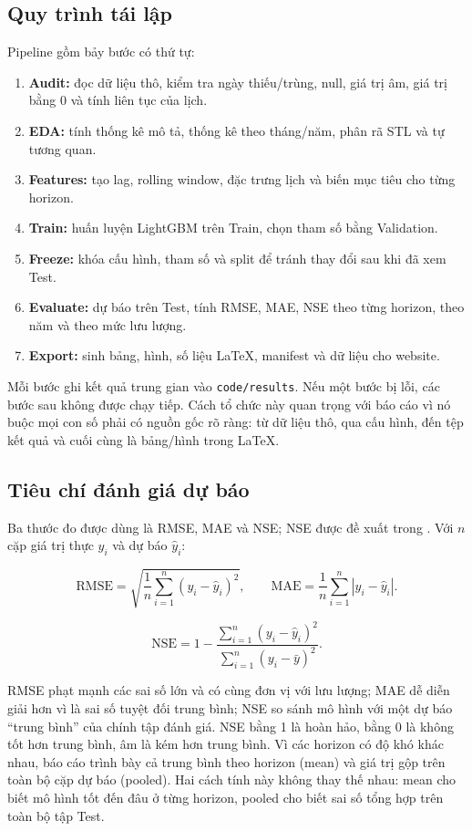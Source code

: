 \subsection{Quy trình tái lập}

Pipeline gồm bảy bước có thứ tự:

\begin{enumerate}[leftmargin=1.6em]
  \item \textbf{Audit:} đọc dữ liệu thô, kiểm tra ngày thiếu/trùng, null, giá trị
  âm, giá trị bằng 0 và tính liên tục của lịch.
  \item \textbf{EDA:} tính thống kê mô tả, thống kê theo tháng/năm, phân rã STL và
  tự tương quan.
  \item \textbf{Features:} tạo lag, rolling window, đặc trưng lịch và biến mục tiêu
  cho từng horizon.
  \item \textbf{Train:} huấn luyện LightGBM trên Train, chọn tham số bằng Validation.
  \item \textbf{Freeze:} khóa cấu hình, tham số và split để tránh thay đổi sau khi
  đã xem Test.
  \item \textbf{Evaluate:} dự báo trên Test, tính RMSE, MAE, NSE theo từng horizon,
  theo năm và theo mức lưu lượng.
  \item \textbf{Export:} sinh bảng, hình, số liệu LaTeX, manifest và dữ liệu cho
  website.
\end{enumerate}

Mỗi bước ghi kết quả trung gian vào \texttt{code/results}. Nếu một bước bị lỗi, các
bước sau không được chạy tiếp. Cách tổ chức này quan trọng với báo cáo vì nó buộc
mọi con số phải có nguồn gốc rõ ràng: từ dữ liệu thô, qua cấu hình, đến tệp kết quả
và cuối cùng là bảng/hình trong LaTeX.

\subsection{Tiêu chí đánh giá dự báo}

Ba thước đo được dùng là RMSE, MAE và NSE; NSE được đề xuất trong
\cite{nash1970}. Với $n$ cặp giá trị thực $y_i$ và dự báo $\hat{y}_i$:

\begin{equation}
\mathrm{RMSE} = \sqrt{\frac{1}{n}\sum_{i=1}^{n}(y_i-\hat{y}_i)^2},
\qquad
\mathrm{MAE} = \frac{1}{n}\sum_{i=1}^{n}|y_i-\hat{y}_i|.
\label{eq:rmse-mae}
\end{equation}

\begin{equation}
\mathrm{NSE} = 1-\frac{\sum_{i=1}^{n}(y_i-\hat{y}_i)^2}
{\sum_{i=1}^{n}(y_i-\bar{y})^2}.
\label{eq:nse}
\end{equation}

RMSE phạt mạnh các sai số lớn và có cùng đơn vị với lưu lượng; MAE dễ diễn giải hơn
vì là sai số tuyệt đối trung bình; NSE so sánh mô hình với một dự báo “trung bình”
của chính tập đánh giá. NSE bằng 1 là hoàn hảo, bằng 0 là không tốt hơn trung bình,
âm là kém hơn trung bình. Vì các horizon có độ khó khác nhau, báo cáo trình bày cả
trung bình theo horizon (mean) và giá trị gộp trên toàn bộ cặp dự báo (pooled). Hai
cách tính này không thay thế nhau: mean cho biết mô hình tốt đến đâu ở từng horizon,
pooled cho biết sai số tổng hợp trên toàn bộ tập Test.
